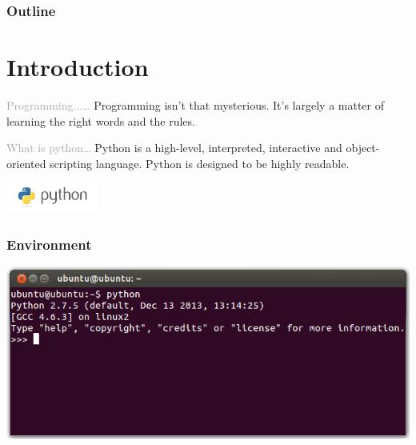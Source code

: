 \documentclass{../py-lecture}
\subtitle{Introduction}
\begin{document}
\begin{frame}
  \titlepage{}
\end{frame}
\begin{frame}
  \frametitle{Outline}
  \tableofcontents{}
\end{frame}

\section{Introduction}

\begin{frame}
  \begin{block}{
      \centering\textcolor{darkgray}{Programming...\ldots}}
      Programming isn't that mysterious. It's largely a matter of learning the right words and the rules.
  \end{block}
\end{frame}

\begin{frame}
  \begin{block}{
      \centering\textcolor{darkgray}{What is python\ldots}}
      Python is a high-level, interpreted, interactive and object-oriented scripting language. Python is designed to be highly readable.
  \end{block}
  \vspace{.75cm}
  \hspace*{8.5cm}\includegraphics[width=3cm]{img/python.jpg}
\end{frame}

\begin{frame}
	\frametitle{Environment}
	\includegraphics[width=\linewidth]{img/python-console-linux.png}
\end{frame}
\end{document}
